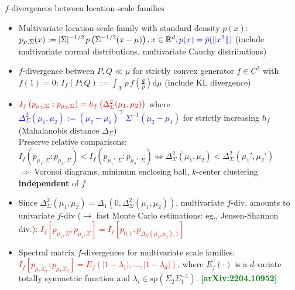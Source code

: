 \documentclass{beamer}
\def\calX{\mathcal{X}}
\def\dmu{\mathrm{d}\mu}
\begin{document}
\begin{frame}{$f$-divergences between location-scale families}

\begin{itemize}
	\item Multivariate 
	location-scale family with standard density $p(x)$:
	\textcolor{red}{$
p_{\mu, \Sigma}(x) := |\Sigma|^{-1/2} \,  p\left(\Sigma^{-1/2}(x-\mu)\right), x \in \mathbb{R}^d, \textcolor{blue}{p(x)=\tilde{p}(\|x^2\|)}
$}   (include multivariate normal distributions, multivariate Cauchy distributions) 
\item $f$-divergence between $P,Q\ll\mu$ for strictly convex generator $f\in C^2$ with $f(1)=0$:
$
I_f(P:Q):=\int_\calX p\, f\left(\frac{q}{p}\right) \dmu
$ (include KL divergence)

\item  
$\textcolor{red}{I_f \left(p_{\mu_1, \Sigma} : p_{\mu_2, \Sigma} \right)= h_f \left( \Delta_\Sigma^2(\mu_1,\mu_2) \right)}$ where
\textcolor{blue}{$\Delta_\Sigma^2(\mu_1,\mu_2) := (\mu_2-\mu_1)^\top\, \Sigma^{-1} (\mu_2-\mu_1)$} for strictly increasing $h_f$ (Mahalanobis distance $\Delta_\Sigma$)\\
Preserve relative comparisons:\\
$I_f(p_{\mu_1, \Sigma} : p_{\mu_2, \Sigma})<I_f(p_{\mu_1', \Sigma} : p_{\mu_2', \Sigma}) \Leftrightarrow 
\Delta_\Sigma^2(\mu_1,\mu_2) < \Delta_\Sigma^2(\mu_1',\mu_2')
$ \\
{\footnotesize $\Rightarrow$ Voronoi diagrams, minimum enclosing ball, $k$-center clustering {\bf independent} of $f$}

\item Since $\Delta_\Sigma^2(\mu_1,\mu_2)=\Delta_{1}(0,\Delta_\Sigma^2(\mu_1,\mu_2))$, multivariate $f$-div. amounts to univariate $f$-div ($\rightarrow$ fast Monte Carlo estimations: eg., Jensen-Shannon div.):
\textcolor{red}{$I_f[p_{\mu_1,\Sigma},p_{\mu_2,\Sigma}] = I_f \left[p_{0,1},p_{\Delta_\Sigma(\mu_1,\mu_2),1}\right]$}

\item Spectral matrix $f$-divergences for multivariate scale families:
\textcolor{red}{$I_f[p_{\mu,\Sigma_1}:p_{\mu,\Sigma_2}]=E_f(|1-\lambda_1|,\ldots,|1-\lambda_d|)$}, 
where $E_f(\cdot)$ is a $d$-variate totally symmetric function and $\lambda_i\in \mathrm{sp}(\Sigma_2\Sigma_1^{-1})$. 
\hfill
{\bf \textcolor{green}{[arXiv:2204.10952]}}
\end{itemize}


\end{frame}
\end{document}
